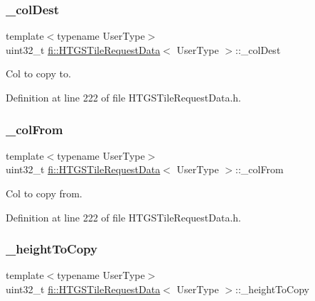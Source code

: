 \subsubsection{\texorpdfstring{\+\_\+col\+Dest}{\_colDest}}
{\footnotesize\ttfamily template$<$typename User\+Type$>$ \\
uint32\+\_\+t \hyperlink{classfi_1_1HTGSTileRequestData}{fi\+::\+H\+T\+G\+S\+Tile\+Request\+Data}$<$ User\+Type $>$\+::\+\_\+col\+Dest\hspace{0.3cm}{\ttfamily [private]}}



Col to copy to. 



Definition at line 222 of file H\+T\+G\+S\+Tile\+Request\+Data.\+h.

\mbox{\label{classfi_1_1HTGSTileRequestData_a85fbf2300bbed12b1a24d00dfc3988ac}} 
\subsubsection{\texorpdfstring{\+\_\+col\+From}{\_colFrom}}
{\footnotesize\ttfamily template$<$typename User\+Type$>$ \\
uint32\+\_\+t \hyperlink{classfi_1_1HTGSTileRequestData}{fi\+::\+H\+T\+G\+S\+Tile\+Request\+Data}$<$ User\+Type $>$\+::\+\_\+col\+From\hspace{0.3cm}{\ttfamily [private]}}



Col to copy from. 



Definition at line 222 of file H\+T\+G\+S\+Tile\+Request\+Data.\+h.

\mbox{\label{classfi_1_1HTGSTileRequestData_a3969cdb64ee0d894d4d86eb739010999}} 
\subsubsection{\texorpdfstring{\+\_\+height\+To\+Copy}{\_heightToCopy}}
{\footnotesize\ttfamily template$<$typename User\+Type$>$ \\
uint32\+\_\+t \hyperlink{classfi_1_1HTGSTileRequestData}{fi\+::\+H\+T\+G\+S\+Tile\+Request\+Data}$<$ User\+Type $>$\+::\+\_\+height\+To\+Copy\hspace{0.3cm}{\ttfamily [private]}}



